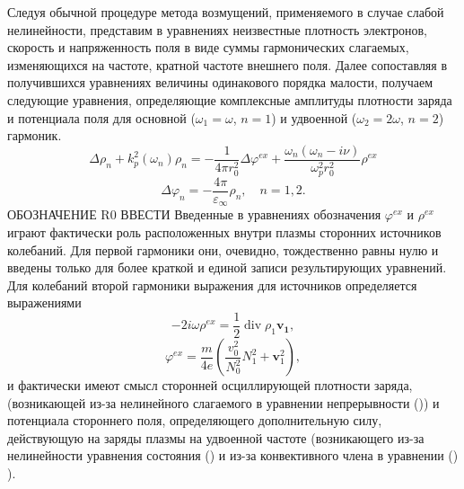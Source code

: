 \documentclass[12pt, a4paper]{article}
\renewcommand{\vec}{\mathbf}
\def \eps {\varepsilon}
\def \w {\omega}
\def \ph {\varphi}
\begin{document}
Следуя обычной процедуре метода возмущений, применяемого в случае слабой нелинейности, представим в уравнениях неизвестные плотность электронов, скорость и напряженность поля в виде суммы гармонических слагаемых, изменяющихся на частоте, кратной частоте внешнего поля. Далее сопоставляя в получившихся уравнениях величины одинакового порядка малости, получаем следующие уравнения, определяющие комплексные амплитуды плотности заряда и потенциала поля для основной ($\w_1=\w$, $n=1$) и удвоенной ($\w_2=2\w$, $n=2$) гармоник.
\begin{equation} 
 \Delta \rho_n + k_p^2(\w_n)\rho_n = -\frac{1}{4 \pi r_0^2} \Delta \ph^{ex} + \frac{\w_n(\w_n - i \nu)}{\w_p^2r_0^2} \rho^{ex}
\end{equation}
\begin{equation} 
 \Delta \ph_n = - \frac{4 \pi}{\eps_\infty} \rho_n, \quad n = 1,2. 
\end{equation}
ОБОЗНАЧЕНИЕ R0 ВВЕСТИ
Введенные в уравнениях обозначения $\ph^{ex}$ и $\rho^{ex}$ играют фактически роль расположенных внутри плазмы сторонних источников колебаний. Для первой гармоники они, очевидно, тождественно равны нулю и введены только для более краткой и единой записи результирующих уравнений. Для колебаний второй гармоники выражения для источников определяется выражениями 
\begin{equation}
 - 2i\w \rho^{ex} = \frac{1}{2}\operatorname{div} \rho_1 \vec{v_1},
\end{equation}
\begin{equation}
\ph^{ex} = \frac{m}{4e}(\frac{v_0^2}{N_0^2}N_1^2 + \vec{v}_1^2),
\end{equation}
и фактически имеют смысл сторонней осциллирующей плотности заряда, (возникающей из-за нелинейного слагаемого в уравнении непрерывности ()) и потенциала стороннего поля, определяющего дополнительную силу, действующую на заряды плазмы на удвоенной частоте (возникающего из-за нелинейности уравнения состояния () и из-за конвективного члена в уравнении () ). 
\end{document}
